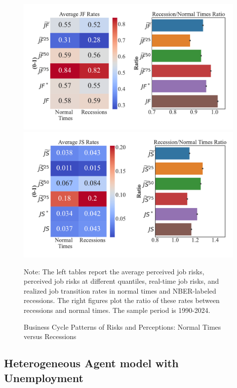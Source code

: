 \begin{figure}[pt] 
\centering 
	\caption{Business Cycle Patterns of Risks and Perceptions: Normal Times versus Recessions} 
	\label{fig:bus_cycle_stats_av}
\includegraphics[width=0.8\linewidth]{text/Chapter2/Figures/business_cycle_JF_stats.pdf} \\
\includegraphics[width=0.8\linewidth]{text/Chapter2/Figures/business_cycle_JS_stats.pdf} \\
 	
    	\begin{flushleft}\footnotesize {Note: The left tables report the average perceived job risks, perceived job risks at different quantiles, real-time job risks, and realized job transition rates in normal times and NBER-labeled recessions. The right figures plot the ratio of these rates between recessions and normal times. The sample period is 1990-2024.} \end{flushleft}
\end{figure}



\subsection{Heterogeneous Agent model with Unemployment}\label{appendix:model}

